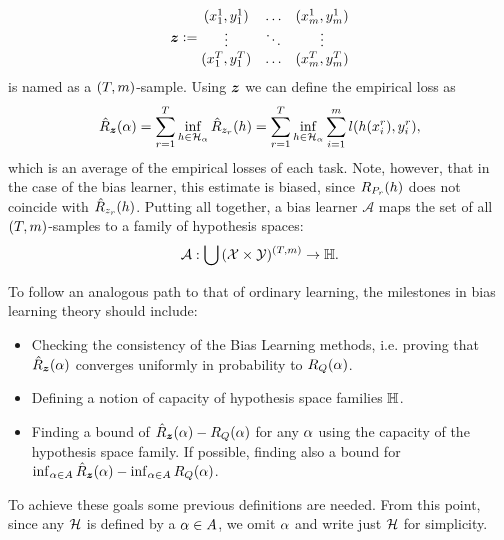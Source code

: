 \begin{equation}
    \nonumber
    \bm{z} \vcentcolon= 
    \begin{matrix}
        (x_1^1, y_1^1) & \ldots & (x_m^1, y_m^1) \\
        \vdots & \ddots & \vdots \\
        (x_1^T, y_1^T) & \ldots & (x_m^T, y_m^T) \\
    \end{matrix}
\end{equation}
is named as a $(T, m)$-sample.
Using $\bm{z}$ we can define the empirical loss as
\begin{equation}\label{eq:biaslearn_emprisk}
    \bemprisk(\param) = \sum_{r=1}^\ntasks \inf_{\hypf \in \hypspace_\param} \hat{\risk}_{\sample_r}(\hypf) = \sum_{r=1}^\ntasks \inf_{\hypf \in \hypspace_\param} \sum_{i=1}^m l(\hypf(x_i^r), y_i^r),
\end{equation}
which is an average of the empirical losses of each task. 
Note, however, that in the case of the bias learner, this estimate is biased, since $R_{P_r}(h)$ does not coincide with $\hat{R}_{z_r}(h)$. 
Putting all together, a bias learner $\mathcal{A}$ maps the set of all $(T, m)$-samples to a family of hypothesis spaces:
\begin{equation}
    \nonumber
    \mathcal{A} : \bigcup {(\mathcal{X}\times \mathcal{Y})^{(T, m)}} \to \mathbb{H}.
\end{equation}
%

To follow an analogous path to that of ordinary learning, the milestones in bias learning theory should include:
\begin{itemize}
    \item Checking the consistency of the Bias Learning methods, i.e. proving that $\hat{R}_{\bm{z}}(\alpha)$ converges uniformly in probability to $R_Q(\alpha)$.
    \item Defining a notion of capacity of hypothesis space families $\mathbb{H}$.
    \item Finding a bound of $\hat{R}_{\bm{z}}(\alpha) - R_Q(\alpha)$ for any $\alpha$ using the capacity of the hypothesis space family. If possible, finding also a bound for $\inf_{\alpha \in A}\hat{R}_{\bm{z}}(\alpha) - \inf_{\alpha \in A} R_Q(\alpha)$.
\end{itemize}
To achieve these goals some previous definitions are needed. From this point, since any $\mathcal{H}$ is defined by a $\alpha \in A$, we omit $\alpha$ and write just $\mathcal{H}$ for simplicity.
%
